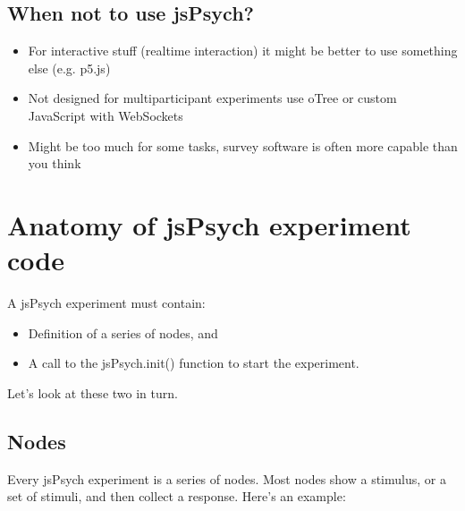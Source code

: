 \documentclass[letterpaper,10pt,english]{sphinxmanual}
\begin{document}
\subsection{When not to use jsPsych?}
\label{\detokenize{jspsych_au:when-not-to-use-jspsych}}\begin{itemize}
\item {} 
For  interactive stuff (realtime interaction) it might be better to use
something else (e.g. p5.js)

\item {} 
Not designed for multi\sphinxhyphen{}participant experiments \textendash{} use oTree or custom JavaScript
with WebSockets

\item {} 
Might be too much for some tasks, survey software is often more capable than
you think

\end{itemize}


\section{Anatomy of jsPsych experiment code}
\label{\detokenize{jspsych_au:anatomy-of-jspsych-experiment-code}}
A jsPsych experiment must contain:
\begin{itemize}
\item {} 
Definition of a series of nodes, and

\item {} 
A call to the jsPsych.init() function to start the experiment.

\end{itemize}

Let’s look at these two in turn.


\subsection{Nodes}
\label{\detokenize{jspsych_au:nodes}}
Every jsPsych experiment is a series of nodes. Most nodes show a stimulus, or a set of stimuli,
and then collect a response. Here’s an example:

\begin{sphinxVerbatim}[commandchars=\\\{\}]
   
     
     
\end{sphinxVerbatim}
\end{document}
